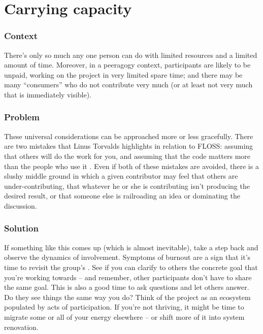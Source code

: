 

\section{Carrying capacity}\label{sec:Carrying_capacity}
\subsubsection*{Context} There's only so much any one person can do with
limited resources and a limited amount of time.  Moreover, in a
peeragogy context, participants are likely to be unpaid, working on
the project in very limited spare time; and there may be many
``consumers'' who do not contribute very much (or at least not very much that is immediately visible).

\subsubsection*{Problem} These universal considerations can
be approached more or less gracefully.  There are two mistakes that
Linus Torvalds highlights in relation to FLOSS: assuming that others
will do the work for you, and assuming that the code matters more than
the people who use it \cite{torvalds-interview}.  Even if both of these mistakes are avoided,
there is a slushy middle ground in which a given contributor may feel
that others are under-contributing, that whatever he or she is
contributing isn't producing the desired result, or that someone else
is railroading an idea or dominating the discussion.

\subsubsection*{Solution} If something like this comes up (which is almost inevitable),
take a step back and observe the dynamics of involvement.  Symptoms of
burnout are a sign that it's time to revisit the group's
.  See if you can clarify to others the concrete
goal that you're working towards -- and remember, other participants
don't have to share the same goal.  This is also a good time to ask
questions and let others answer.  Do they see things the same way you do?
Think of the project as an ecosystem populated by acts of participation.
If you're not thriving, it might be time to migrate some or all of your energy
elsewhere -- or shift more of it into system renovation.

